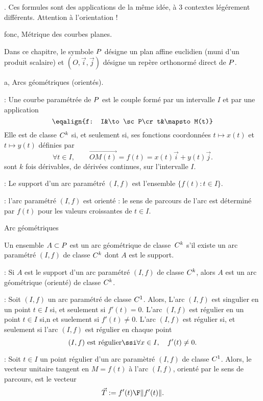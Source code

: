 \Remarque. Ces formules sont des applications de la même idée, 
à $3$ contextes légérement différents. Attention à l'orientation ! 



\eject
{}

\pagetitretrue

\Chapter fonc, Métrique des courbes planes.
\bigskip


\noindent
Dans ce chapitre, le symbole $\sc P$ désigne un plan affine euclidien (muni d'un produit scalaire) 
et $(O,\vec i,\vec j)$ désigne un repère orthonormé direct de $\sc P$. 
\bigskip

\Section a, Arcs géométriques (orientés).

\Rappel : Une courbe paramétrée de $\sc P$ est le couple formé par un intervalle $I$ et par une application 
$$
\eqalign{f: I&\to\sc P\cr t&\mapsto  M(t)}
$$ 
Elle est de classe $\sc C^k$ si, et seulement si, ses fonctions coordonnées $t\mapsto x(t)$ et $t\mapsto y(t)$ définies par 
$$
\forall t\in I, \qquad \vec {OM(t)}=f(t)=x(t)\vec i+y(t)\vec j. 
$$
sont $k$ fois dérivables, de dérivées continues, sur l'intervalle $I$. 
\bigskip

\Rappel : Le support d'un arc paramétré $(I,f)$ est l'ensemble $\{f(t):t\in I\}$. 
\bigskip

\Remarque : l'arc paramétré $(I,f)$ est orienté : le sens de parcours de l'arc est déterminé par $f(t)$ pour les valeurs croissantes de $t\in I$. 
\bigskip

\Concept Arc géométriques

\Definition[] Un ensemble $A\subset\sc P$ est un arc géométrique de classe~$\sc C^k$  
s'il existe un arc paramétré $(I,f)$ de classe $\sc C^k$ dont $A$ est le support. 
\bigskip

\Remarque : Si $A$ est le support d'un arc paramétré $(I,f)$ de classe $\sc C^k$, alors $A$ est un arc géométrique (orienté) de classe $\sc C^k$. 
\bigskip


\Rappel :  Soit $(I,f)$ un arc paramétré de classe $\sc C^1$. Alors, \medskip\noindent
L'arc $(I,f)$ est singulier en un point $t\in I$ si, et seulement si $f'(t)=0$. \medskip\noindent
L'arc $(I,f)$ est régulier en un point $t\in I$ si,n et suelement si $f'(t)\neq 0$. \medskip\noindent
L'arc $(I,f)$ est régulier si, et seulement si 
l'arc $(I,f)$ est régulier en chaque point 
$$
(I,f)\mbox{ est régulier}\ssi\forall x\in I, \quad f'(t)\neq 0.
$$

\Rappel :  Soit $t\in I$ un point régulier d'un arc paramètré $(I,f)$ de classe $\sc C^1$. 
Alors, le vecteur unitaire tangent en $M=f(t)$ à l'arc $(I,f)$, orienté par le sens de parcours, est le vecteur 
$$
\vec T:={f'(t)\F\|f'(t)\|}. 
$$


